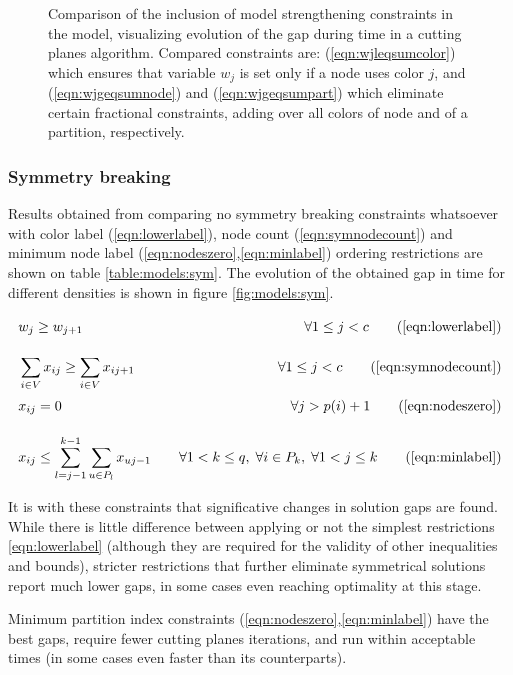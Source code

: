 \begin{figure}
\caption{Comparison of the inclusion of model strengthening constraints in the model, visualizing evolution of the gap during time in a cutting planes algorithm. Compared constraints are: (\ref{eqn:wjleqsumcolor}) which ensures that variable $w_j$ is set only if a node uses color $j$, and (\ref{eqn:wjgeqsumnode}) and (\ref{eqn:wjgeqsumpart}) which eliminate certain fractional constraints, adding over all colors of node and of a partition, respectively.}
\label{fig:models:colorbound}
\end{figure}

\subsubsection{Symmetry breaking}

Results obtained from comparing no symmetry breaking constraints whatsoever with color label (\ref{eqn:lowerlabel}), node count (\ref{eqn:symnodecount}) and minimum node label (\ref{eqn:nodeszero},\ref{eqn:minlabel}) ordering restrictions are shown on table \ref{table:models:sym}. The evolution of the obtained gap in time for different densities is shown in figure \ref{fig:models:sym}. 

\begin{align*}
& w_j \geq w_{j+1} \sumheight \quad &\forall 1 \leq j < c \tag{\ref{eqn:lowerlabel}} \\
& \sum_{i \in V} x_{ij} \geq \sum_{i \in V} x_{ij+1} \quad &\forall 1 \leq j < c \tag{\ref{eqn:symnodecount}} \\
& x_{ij} = 0 \sumheight \quad &\forall j > p(i) + 1 \tag{\ref{eqn:nodeszero}} \\
& x_{ij} \leq \sum_{l = j-1}^{k-1} \sum_{u \in P_l} x_{uj-1} \quad &\forall 1 < k \leq q, \; \forall i \in P_k, \; \forall 1 < j \leq k \tag{\ref{eqn:minlabel}}
\end{align*}

It is with these constraints that significative changes in solution gaps are found. While there is little difference between applying or not the simplest restrictions \ref{eqn:lowerlabel} (although they are required for the validity of other inequalities and bounds), stricter restrictions that further eliminate symmetrical solutions report much lower gaps, in some cases even reaching optimality at this stage. 

Minimum partition index constraints (\ref{eqn:nodeszero},\ref{eqn:minlabel}) have the best gaps, require fewer cutting planes iterations, and run within acceptable times (in some cases even faster than its counterparts).

